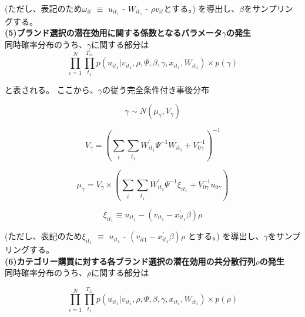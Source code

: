 \documentclass[11pt]{jsarticle}
\begin{document}
(ただし、表記のため$\omega_{it}$ $\equiv$ $u_{it_{1}}$ - $W_{it_{\gamma}}$ - $\rho v_{it}$とする。)
を導出し、$\beta$をサンプリングする。\\[1ex] 

{\bf (5)ブランド選択の潜在効用に関する係数となるパラメータ$\gamma$の発生}\\
同時確率分布のうち、$\gamma$に関する部分は
\begin{equation} \label{formula45}
\prod_{i=1}^{N} \prod_{t_{1}}^{T_{i1}} p(u_{it_{1}} | v_{it_{1}}, \rho, \Psi, \beta, \gamma, x_{it_{1}}, W_{it_{1}}) \times p(\gamma)
\end{equation}

と表される。
ここから、$\gamma$の従う完全条件付き事後分布

\begin{equation} \label{formula46}
\gamma \sim N(\mu_{\gamma}, V_{\gamma})
\end{equation}

\begin{equation} \label{formula47}
V_{\gamma} = 
\left(
\sum_{\substack{i}} \sum_{\substack{t_{1}}} W^{\prime}_{it_{1}} \Psi^{-1} W_{it_{1}} + V^{-1}_{0\gamma}
\right)^{-1}
\end{equation}

\begin{equation} \label{formula48}
\mu_{\gamma} = V_{\gamma} \times
\left(
\sum_{\substack{i}} \sum_{\substack{t_{1}}} W^{\prime}_{it_{1}} \Psi^{-1} \xi_{it_{1}} + V^{-1}_{0\gamma} u_{0\gamma}
\right)
\end{equation}

\begin{equation} \label{formula48-1}
\xi_{it_{1}} \equiv u_{it_{1}} - (v_{it_{1}} - x^{\prime}_{it_{1}} \beta) \rho
\end{equation}

(ただし、表記のため$\xi_{it_{1}}$ $\equiv$ $u_{it_{1}}$ - $(v_{it{1}} - x^{\prime}_{it_{1}}\beta)\rho$ とする。)
を導出し、$\gamma$をサンプリングする。\\[1ex] 

{\bf (6)カテゴリー購買に対する各ブランド選択の潜在効用の共分散行列$\rho$の発生}\\
同時確率分布のうち、$\rho$に関する部分は

\begin{equation} \label{formula49}
\prod_{i=1}^{N} \prod_{t_{1}}^{T_{i1}} p(u_{it_{1}} | v_{it_{1}}, \rho, \Psi, \beta, \gamma, x_{it_{1}}, W_{it_{1}}) \times p(\rho)
\end{equation}
\end{document}
